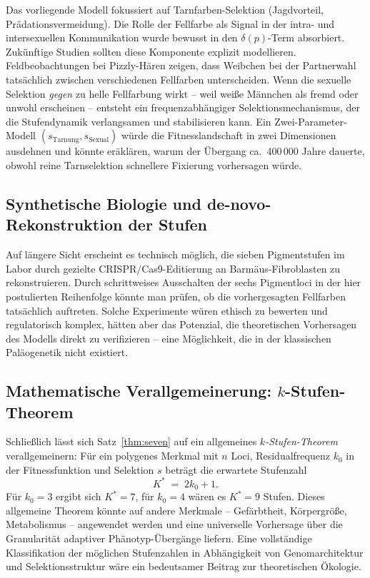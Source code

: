 ﻿\documentclass[12pt,a4paper]{article}
\theoremstyle{remark}
\begin{document}
Das vorliegende Modell fokussiert auf Tarnfarben-Selektion (Jagdvorteil,
Pr\"{a}dationsvermeidung). Die Rolle der Fellfarbe als Signal in der
intra- und intersexuellen Kommunikation wurde bewusst in den
$\delta(p)$-Term absorbiert. Zuk\"{u}nftige Studien sollten diese
Komponente explizit modellieren. Feldbeobachtungen bei Pizzly-H\"{a}ren
zeigen, dass Weibchen bei der Partnerwahl tats\"{a}chlich zwischen
verschiedenen Fellfarben unterscheiden. Wenn die sexuelle Selektion
\emph{gegen} zu helle Fellfarbung wirkt -- weil wei\ss{}e M\"{a}nnchen
als fremd oder unwohl erscheinen -- entsteht ein frequenzabh\"{a}ngiger
Selektionsmechanismus, der die Stufendynamik verlangsamen und stabilisieren
kann. Ein Zwei-Parameter-Modell $(s_{\text{Tarnung}}, s_{\text{Sexual}})$
w\"{u}rde die Fitnesslandschaft in zwei Dimensionen ausdehnen und k\"{o}nnte
er\"{a}kl\"{a}ren, warum der \"{U}bergang ca.~400\,000 Jahre dauerte,
obwohl reine Tarnselektion schnellere Fixierung vorhersagen w\"{u}rde.

\subsection{Synthetische Biologie und de-novo-Rekonstruktion der Stufen}

Auf l\"{a}ngere Sicht erscheint es technisch m\"{o}glich, die sieben Pigmentstufen
im Labor durch gezielte CRISPR/Cas9-Editierung an Barm\"{a}us-Fibroblasten
zu rekonstruieren. Durch schrittweises Ausschalten der sechs Pigmentloci
in der hier postulierten Reihenfolge k\"{o}nnte man pr\"{u}fen, ob die
vorhergesagten Fellfarben tats\"{a}chlich auftreten. Solche Experimente
w\"{u}ren ethisch zu bewerten und regulatorisch komplex, h\"{a}tten aber
das Potenzial, die theoretischen Vorhersagen des Modells direkt zu
verifizieren -- eine M\"{o}glichkeit, die in der klassischen Pal\"{a}ogenetik
nicht existiert.

\subsection{Mathematische Verallgemeinerung: $k$-Stufen-Theorem}

Schlie\ss{}lich l\"{a}sst sich Satz~\ref{thm:seven} auf ein allgemeines
\emph{$k$-Stufen-Theorem} verallgemeinern: F\"{u}r ein polygenes Merkmal
mit $n$ Loci, Residualfrequenz $k_0$ in der Fitnessfunktion und
Selektion $s$ betr\"{a}gt die erwartete Stufenzahl
\[
  K^* \;=\; 2k_0 + 1.
\]
F\"{u}r $k_0 = 3$ ergibt sich $K^* = 7$, f\"{u}r $k_0 = 4$ w\"{a}ren es
$K^* = 9$ Stufen. Dieses allgemeine Theorem k\"{o}nnte auf andere
Merkmale -- Gef\"{a}rbtheit, K\"{o}rpergr\"{o}\ss{}e, Metabolismus --
angewendet werden und eine universelle Vorhersage \"{u}ber die
Granularit\"{a}t adaptiver Ph\"{a}notyp-\"{U}berg\"{a}nge liefern.
Eine vollst\"{a}ndige Klassifikation der m\"{o}glichen Stufenzahlen
in Abh\"{a}ngigkeit von Genomarchitektur und Selektionsstruktur
w\"{a}re ein bedeutsamer Beitrag zur theoretischen \"{O}kologie.
\end{document}

